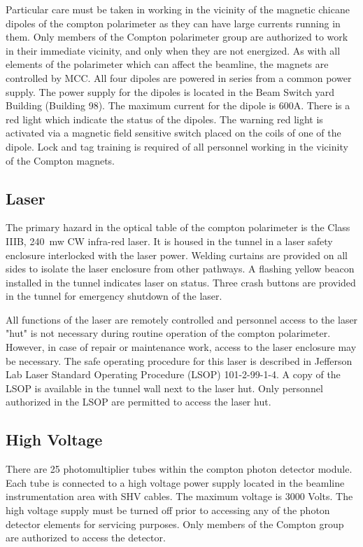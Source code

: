 {\begin{safetyen}{10}{15}
Particular care must be taken in working in the vicinity of the
magnetic chicane dipoles of the compton polarimeter as they can have large currents
running in them. Only members of the Compton polarimeter group are
authorized to work in their immediate vicinity, and only when they are
not energized. As with all elements of the
polarimeter which can
affect the beamline, the magnets are controlled by MCC. All four dipoles are
powered in series from a common power supply. The power supply for
the dipoles is located in the Beam Switch yard Building (Building 98).
The maximum current for the dipole is 600A. There is a
red light which indicate the status of the dipoles. The warning red
light is activated via a magnetic field sensitive switch placed
on the coils of one of the dipole. Lock and tag training is required of all personnel working
in the vicinity of the Compton magnets. \\

\subsection{Laser}
The primary hazard in the optical table of the compton polarimeter is the Class IIIB, 240~mw 
CW infra-red laser.
It is housed in the tunnel in a laser safety enclosure interlocked with the laser power.
Welding curtains are provided on all sides to isolate the laser enclosure from other pathways.
A flashing yellow beacon installed in the tunnel indicates laser on status. Three crash  buttons
are provided in the tunnel for emergency shutdown of the laser.

All functions of the laser are remotely controlled and personnel access to the laser "hut" 
is not necessary during routine operation of the compton polarimeter. However, in case of repair  
or maintenance work, access to the laser enclosure may be necessary. The safe operating procedure for this laser is described in 
Jefferson Lab Laser Standard Operating Procedure (LSOP) 101-2-99-1-4. A copy of the LSOP is 
available in the tunnel wall next to the laser hut. Only personnel authorized in the LSOP are
permitted to access the laser hut.
 

\subsection{High Voltage}

There are 25 photomultiplier tubes within the compton photon detector module.
Each tube is connected to a high voltage power supply located in the beamline instrumentation area
with SHV cables. The maximum voltage is 3000 Volts.
The high voltage supply must be turned off prior to accessing  any of the photon detector elements
for servicing purposes. Only members of the Compton group
are authorized to access the  detector.\\


\end{safetyen}}
